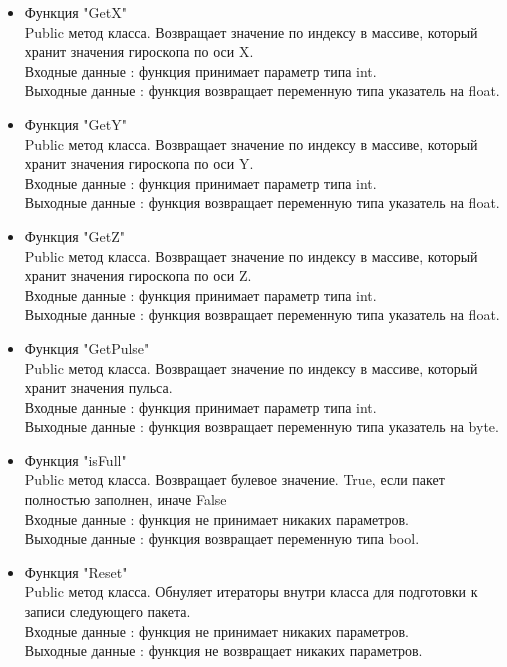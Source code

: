 \documentclass[a4document]{article}
\begin{document}
{\begin{itemize}
\begin{itemize}
                    Выходные данные : функция возвращает переменную типа указатель на float.
                \item Функция "GetX" \\
                    Public метод класса. Возвращает значение по индексу в массиве, который хранит значения гироскопа по оси X. \\ 
                    Входные данные : функция принимает параметр типа int. \\
                    Выходные данные : функция возвращает переменную типа указатель на float.
                \item Функция "GetY" \\
                    Public метод класса. Возвращает значение по индексу в массиве, который хранит значения гироскопа по оси Y. \\ 
                    Входные данные : функция принимает параметр типа int. \\
                    Выходные данные : функция возвращает переменную типа указатель на float.
                \item Функция "GetZ" \\
                    Public метод класса. Возвращает значение по индексу в массиве, который хранит значения гироскопа по оси Z. \\ 
                    Входные данные : функция принимает параметр типа int. \\
                    Выходные данные : функция возвращает переменную типа указатель на float.
                \newpage
                \item Функция "GetPulse" \\
                    Public метод класса. Возвращает значение по индексу в массиве, который хранит значения пульса. \\ 
                    Входные данные : функция принимает параметр типа int. \\
                    Выходные данные : функция возвращает переменную типа указатель на byte.
                
                \item Функция "isFull" \\
                    Public метод класса. Возвращает булевое значение. True, если пакет полностью заполнен, иначе False \\ 
                    Входные данные : функция не принимает никаких параметров. \\
                    Выходные данные : функция возвращает переменную типа bool.
                \item Функция "Reset" \\
                    Public метод класса. Обнуляет итераторы внутри класса для подготовки к записи следующего пакета.\\
                    Входные данные : функция не принимает никаких параметров. \\
                    Выходные данные : функция не возвращает никаких параметров.
                    

\end{itemize}
\end{itemize}}
\end{document}

